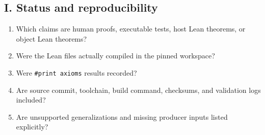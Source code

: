 \subsection*{I. Status and reproducibility}
\begin{enumerate}
  \item Which claims are human proofs, executable tests, host Lean theorems, or object Lean theorems?
  \item Were the Lean files actually compiled in the pinned workspace?
  \item Were \texttt{\#print axioms} results recorded?
  \item Are source commit, toolchain, build command, checksums, and validation logs included?
  \item Are unsupported generalizations and missing producer inputs listed explicitly?
\end{enumerate}

